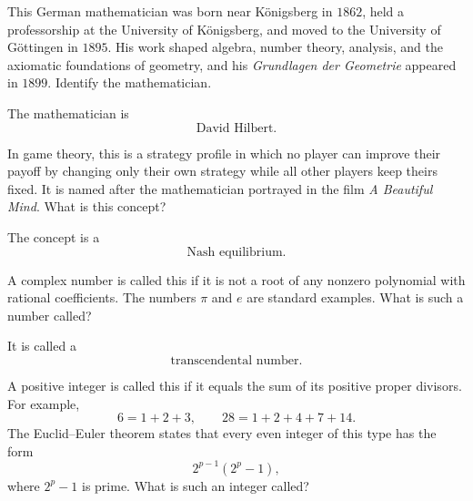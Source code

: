     \begin{expectedproblem}
        This German mathematician was born near K\"onigsberg in $1862$, held a
        professorship at the University of K\"onigsberg, and moved to the
        University of G\"ottingen in $1895$. His work shaped algebra, number
        theory, analysis, and the axiomatic foundations of geometry, and his
        \emph{Grundlagen der Geometrie} appeared in $1899$. Identify the
        mathematician.
    \end{expectedproblem}

    \begin{solution}
        The mathematician is
        \[
            \boxed{\text{David Hilbert}}.
        \]
    \end{solution}

    \begin{expectedproblem}
        In game theory, this is a strategy profile in which no player can
        improve their payoff by changing only their own strategy while all
        other players keep theirs fixed. It is named after the mathematician
        portrayed in the film \emph{A Beautiful Mind}. What is this concept?
    \end{expectedproblem}

    \begin{solution}
        The concept is a
        \[
            \boxed{\text{Nash equilibrium}}.
        \]
    \end{solution}

    \begin{expectedproblem}
        A complex number is called this if it is not a root of any nonzero
        polynomial with rational coefficients. The numbers $\pi$ and $e$ are
        standard examples. What is such a number called?
    \end{expectedproblem}

    \begin{solution}
        It is called a
        \[
            \boxed{\text{transcendental number}}.
        \]
    \end{solution}

    \begin{expectedproblem}
        A positive integer is called this if it equals the sum of its positive
        proper divisors. For example,
        \[
            6=1+2+3,
            \qquad
            28=1+2+4+7+14.
        \]
        The Euclid--Euler theorem states that every even integer of this type
        has the form
        \[
            2^{p-1}(2^p-1),
        \]
        where $2^p-1$ is prime. What is such an integer called?
    \end{expectedproblem}

